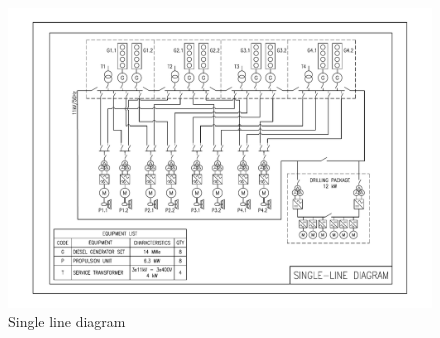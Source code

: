 \begin{figure}%
    \centering
    \includegraphics[scale=0.85, angle=90]{figures/Single_Line_diagram.pdf}
    \caption{Single line diagram}
    \label{fig:SingleLineDiagram}
\end{figure}

